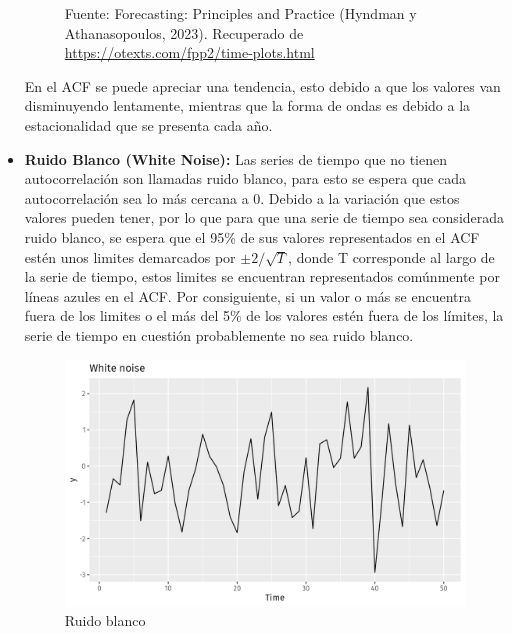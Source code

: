\begin{itemize}
\begin{figure}[H]
        \begin{minipage}[t]{0.9\textwidth}
            Fuente: Forecasting: Principles and Practice (Hyndman y Athanasopoulos, 2023). Recuperado de \url{https://otexts.com/fpp2/time-plots.html}
        \end{minipage}
    \end{figure}

    En el ACF se puede apreciar una tendencia, esto debido a que los valores van disminuyendo lentamente, mientras que la forma de ondas es debido a la estacionalidad que se presenta cada año.

    \item \textbf{Ruido Blanco (White Noise):} Las series de tiempo que no tienen autocorrelación son llamadas ruido blanco, para esto se espera que cada autocorrelación sea lo más cercana a 0. Debido a la variación que estos valores pueden tener, por lo que para que una serie de tiempo sea considerada ruido blanco, se espera que el 95\% de sus valores representados en el ACF estén unos limites demarcados por $\pm{2}/\sqrt{T}$, donde T corresponde al largo de la serie de tiempo, estos limites se encuentran representados comúnmente por líneas azules en el ACF. Por consiguiente, si un valor o más se encuentra fuera de los limites o el más del 5\% de los valores estén fuera de los límites, la serie de tiempo en cuestión probablemente no sea ruido blanco.

    \begin{figure}[H]
        \begin{minipage}[t]{0.9\textwidth}
            \caption{Ruido blanco}
            \label{whitenoise1}        
        \end{minipage}
    
        \vspace{10pt}
    
        \begin{minipage}[b]{0.9\textwidth}
            \centering
            \includegraphics[width=\textwidth]{img/wnoise-1.png}        
        \end{minipage}
    

\end{figure}
\end{itemize}
